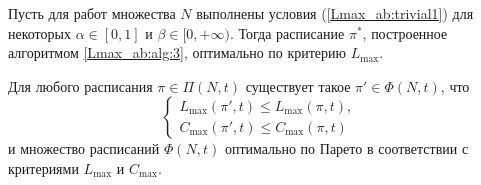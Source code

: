 \begin{theorem} \label{Lmax_ab:th:3}
Пусть для работ множества $N$ выполнены условия (\ref{Lmax_ab:trivial1}) для некоторых $\alpha \in [0,1]$ и $\beta \in [0, +\infty)$. Тогда расписание $\pi^*$, построенное алгоритмом \ref{Lmax_ab:alg:3}, оптимально по критерию $L_{\max}$.

Для любого расписания $\pi \in \Pi(N,t)$ существует такое $\pi' \in \Phi(N,t)$, что
\begin{equation*}
    \begin{cases}
        L_{\max}(\pi',t) \leq L_{\max}(\pi,t),\\
        C_{\max}(\pi',t) \leq C_{\max}(\pi,t)
    \end{cases}
\end{equation*}
и множество расписаний $\Phi(N, t)$ оптимально по Парето в соответствии с критериями $L_{\max}$ и $C_{\max}$.

\end{theorem}
